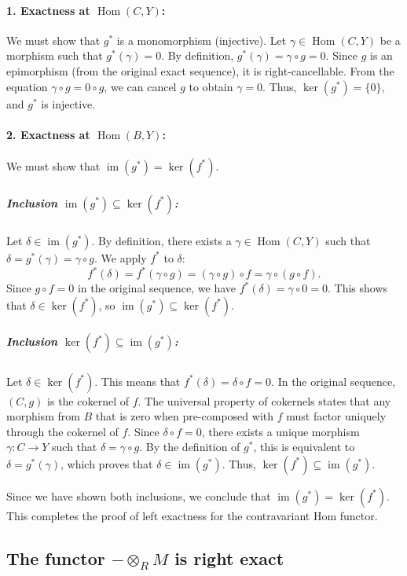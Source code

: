\documentclass[11pt]{article}
\theoremstyle{definition}
\begin{document}
\paragraph{1. Exactness at $\operatorname{Hom}(C, Y)$:} We must show that $g^*$ is a monomorphism (injective).
Let $\gamma \in \operatorname{Hom}(C, Y)$ be a morphism such that $g^*(\gamma) = 0$. By definition, $g^*(\gamma) = \gamma \circ g = 0$. Since $g$ is an epimorphism (from the original exact sequence), it is right-cancellable. From the equation $\gamma \circ g = 0 \circ g$, we can cancel $g$ to obtain $\gamma = 0$. Thus, $\ker(g^*) = \{0\}$, and $g^*$ is injective.

\paragraph{2. Exactness at $\operatorname{Hom}(B, Y)$:} We must show that $\operatorname{im}(g^*) = \ker(f^*)$.

\subparagraph{Inclusion $\operatorname{im}(g^*) \subseteq \ker(f^*)$:}
Let $\delta \in \operatorname{im}(g^*)$. By definition, there exists a $\gamma \in \operatorname{Hom}(C, Y)$ such that $\delta = g^*(\gamma) = \gamma \circ g$. We apply $f^*$ to $\delta$:
\[
f^*(\delta) = f^*(\gamma \circ g) = (\gamma \circ g) \circ f = \gamma \circ (g \circ f).
\]
Since $g \circ f = 0$ in the original sequence, we have $f^*(\delta) = \gamma \circ 0 = 0$. This shows that $\delta \in \ker(f^*)$, so $\operatorname{im}(g^*) \subseteq \ker(f^*)$.

\subparagraph{Inclusion $\ker(f^*) \subseteq \operatorname{im}(g^*)$:}
Let $\delta \in \ker(f^*)$. This means that $f^*(\delta) = \delta \circ f = 0$. In the original sequence, $(C, g)$ is the cokernel of $f$. The universal property of cokernels states that any morphism from $B$ that is zero when pre-composed with $f$ must factor uniquely through the cokernel of $f$.
Since $\delta \circ f = 0$, there exists a unique morphism $\gamma: C \to Y$ such that $\delta = \gamma \circ g$. By the definition of $g^*$, this is equivalent to $\delta = g^*(\gamma)$, which proves that $\delta \in \operatorname{im}(g^*)$. Thus, $\ker(f^*) \subseteq \operatorname{im}(g^*)$.

Since we have shown both inclusions, we conclude that $\operatorname{im}(g^*) = \ker(f^*)$. This completes the proof of left exactness for the contravariant Hom functor.


\subsection{The functor $-\otimes_R M$ is right exact}
\end{document}
